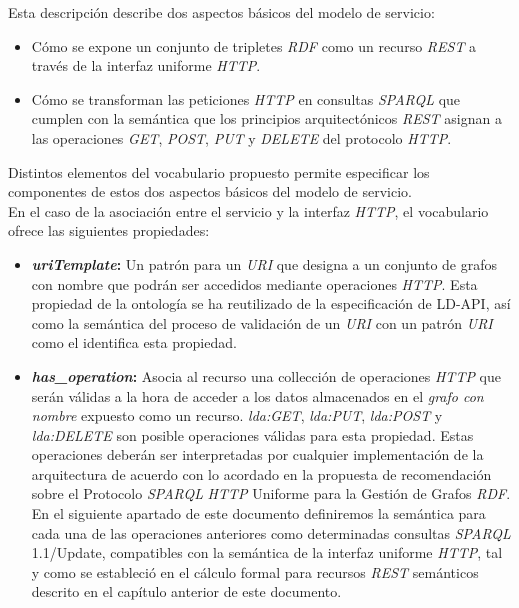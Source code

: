 Esta descripci\'on describe dos aspectos b\'asicos del modelo de servicio:

\begin{itemize}
\item C\'omo se expone un conjunto de tripletes \textit{RDF} como un recurso \textit{REST} a trav\'es de la interfaz uniforme \textit{HTTP}.
\item C\'omo se transforman las peticiones \textit{HTTP} en consultas \textit{SPARQL} que cumplen con la sem\'antica que los principios arquitect\'onicos \textit{REST} asignan a las operaciones \textit{GET}, \textit{POST}, \textit{PUT} y \textit{DELETE} del protocolo \textit{HTTP}.
\end{itemize}

Distintos elementos del vocabulario propuesto permite especificar los componentes de estos dos aspectos b\'asicos del modelo de servicio.\\
En el caso de la asociaci\'on entre el servicio y la interfaz \textit{HTTP}, el vocabulario ofrece las siguientes propiedades:

\begin{itemize}

\item \textbf{\textit{uriTemplate}:} Un patr\'on para un \textit{URI} que designa a un conjunto de grafos con nombre que podr\'an ser accedidos mediante operaciones \textit{HTTP}.  Esta propiedad de la ontolog\'ia se ha reutilizado de la especificaci\'on de LD-API, as\'i como la sem\'antica del proceso de validaci\'on de un \textit{URI} con un patr\'on \textit{URI} como el identifica esta propiedad.
\item \textbf{\textit{has\_operation}:} Asocia al recurso una collecci\'on de operaciones \textit{HTTP} que ser\'an v\'alidas a la hora de acceder a los datos almacenados en el \textit{grafo con nombre} expuesto como un recurso. \textit{lda:GET}, \textit{lda:PUT}, \textit{lda:POST} y \textit{lda:DELETE} son posible operaciones v\'alidas para esta propiedad. Estas operaciones deber\'an ser interpretadas por cualquier implementaci\'on de la arquitectura de acuerdo con lo acordado en la propuesta de recomendaci\'on sobre el Protocolo \textit{SPARQL} \textit{HTTP} Uniforme para la Gesti\'on de Grafos \textit{RDF}. En el siguiente apartado de este documento definiremos la sem\'antica para cada una de las operaciones anteriores como determinadas consultas \textit{SPARQL} 1.1/Update, compatibles con la sem\'antica de la interfaz uniforme \textit{HTTP}, tal y como se estableci\'o en el c\'alculo formal para recursos \textit{REST} sem\'anticos descrito en el cap\'itulo anterior de este documento.

\end{itemize}

